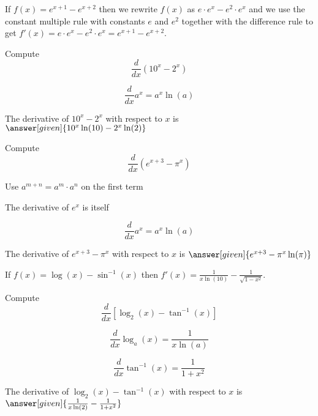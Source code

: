 \documentclass{ximera}
\begin{document}
\begin{example} %
 If $f(x) = e^{x+ 1} - e^{x+2}$ then we rewrite $f(x)$ as $ e\cdot e^x - e^2 \cdot e^x$ and 
we use the constant multiple rule with constants $e$ and $e^2$ together with the difference rule to get 
$f'(x) = e\cdot e^x - e^2 \cdot e^x = e^{x+1} - e^{x+2}$.
\end{example}


\begin{problem} %
  Compute 
  \[
  \frac{d}{dx} \left(10^x - 2^x\right)
  \]
  
    \begin{hint}
      \[
      \frac{d}{dx} a^x = a^x \ln(a)
      \]
    \end{hint}    
		The derivative of $10^x - 2^x$ with respect to $x$ is
		 $\answer[given]{10^x \ln(10) - 2^x \ln(2)}$
	
\end{problem}

\begin{problem} %
  Compute 
  \[
  \frac{d}{dx} \left(e^{x + 3} - \pi^x\right)
  \]
  
  	\begin{hint}
		  Use $a^{m+n} = a^m \cdot a^n$ on the first term
		\end{hint}
		\begin{hint}
		  The derivative of $e^x$ is itself
		\end{hint}
		\begin{hint}
      \[
      \frac{d}{dx} a^x = a^x \ln(a)
      \]
    \end{hint}
		The derivative of $e^{x+3} - \pi^x$ with respect to $x$ is
		 $\answer[given]{e^{x+3}  - \pi^x \ln(\pi)}$
	
\end{problem}



\begin{example} %
 If $f(x) = \log(x) - \sin^{-1}(x)$ then $f'(x) = \frac{1}{x\ln(10)} - \frac{1}{\sqrt{1-x^2}}$.
\end{example}


\begin{problem} %
  Compute 
  \[
  \frac{d}{dx} \left[\log_2(x) - \tan^{-1}(x)\right]
  \]
  
    \begin{hint}
      \[
      \frac{d}{dx} \log_a(x) = \frac{1}{x\ln(a)}
      \]
    \end{hint}
		\begin{hint}
		  \[
      \frac{d}{dx} \tan^{-1}(x) = \frac{1}{1+x^2}
      \]
		\end{hint}
		The derivative of $\log_2(x) - \tan^{-1}(x)$ with respect to $x$ is
		 $\answer[given]{\frac{1}{x\ln(2)}  - \frac{1}{1+x^2}}$
	
\end{problem}
\end{document}
